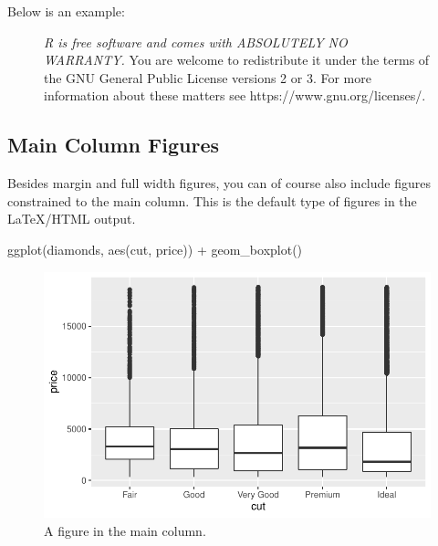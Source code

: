 \documentclass[
  letterpaper,
  DIV=11,
  numbers=noendperiod,
  oneside]{scrartcl}
\newenvironment{Shaded}{\begin{snugshade}}{\end{snugshade}}
\newcommand{\FunctionTok}[1]{\textcolor[rgb]{0.28,0.35,0.67}{#1}}
\newcommand{\NormalTok}[1]{\textcolor[rgb]{0.00,0.23,0.31}{#1}}
\newcommand{\SpecialCharTok}[1]{\textcolor[rgb]{0.37,0.37,0.37}{#1}}
\begin{document}
Below is an example:

\begin{figure}

\emph{R is free software and comes with ABSOLUTELY NO WARRANTY.} You are
welcome to redistribute it under the terms of the GNU General Public
License versions 2 or 3. For more information about these matters see
https://www.gnu.org/licenses/.

\end{figure}

\hypertarget{main-column-figures}{%
\subsection{Main Column Figures}\label{main-column-figures}}

Besides margin and full width figures, you can of course also include
figures constrained to the main column. This is the default type of
figures in the LaTeX/HTML output.

\begin{Shaded}
\begin{Highlighting}[]
\FunctionTok{ggplot}\NormalTok{(diamonds, }\FunctionTok{aes}\NormalTok{(cut, price)) }\SpecialCharTok{+} \FunctionTok{geom\_boxplot}\NormalTok{()}
\end{Highlighting}
\end{Shaded}

\begin{figure}[H]

{\centering \includegraphics{cv_files/figure-pdf/fig-main-1.pdf}

}

\caption{\label{fig-main}A figure in the main column.}

\end{figure}
\end{document}
